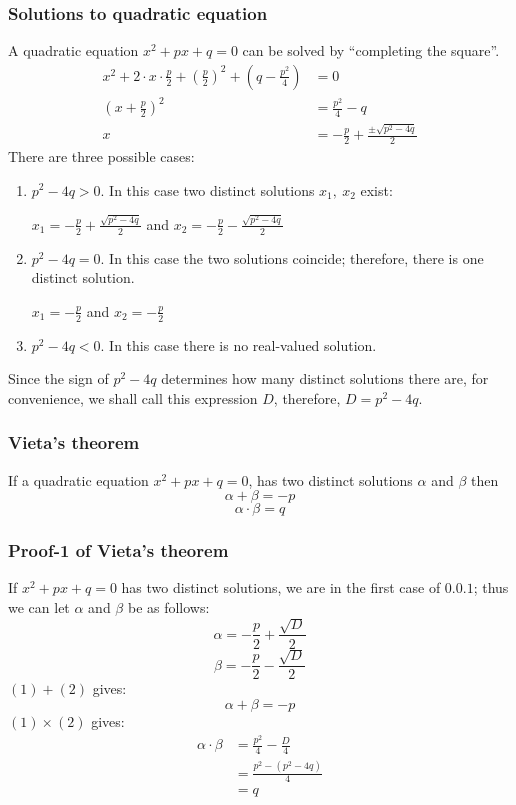\documentclass[12pt]{article}
\begin{document}
\subsubsection{Solutions to quadratic equation}
A quadratic equation $x^2+px+q = 0$ can be solved by ``completing the square''.
\begin{equation*}
	\begin{aligned}
		x^2 + 2 \cdot x \cdot \frac{p}{2} + \left( \frac{p}{2} \right)^2 + \left( q - \frac{p^2}{4} \right) &= 0\\
		\left( x+\frac{p}{2} \right)^2 &= \frac{p^2}{4} - q\\
		x &= -\frac{p}{2} + \frac{ \pm \sqrt{p^2 - 4q} }{2}
	\end{aligned}
\end{equation*}
There are three possible cases:
\begin{enumerate}
	\item $p^2-4q > 0$. In this case two distinct solutions $x_1,\ x_2$ exist: 
	
	$x_1 = -\frac{p}{2} + \frac{ \sqrt{ p^2-4q } }{2}$ and $x_2 = -\frac{p}{2} - \frac{ \sqrt{ p^2-4q } }{2}$
	\item $p^2-4q = 0$. In this case the two solutions coincide; therefore, there is one distinct solution.
	
	$x_1 = -\frac{p}{2}$ and $x_2 = -\frac{p}{2}$
	\item $p^2-4q < 0$. In this case there is no real-valued solution.
\end{enumerate}
Since the sign of $p^2-4q$ determines how many distinct solutions there are, for convenience, we shall call this expression $D$, therefore, $D = p^2-4q$.

\subsubsection{Vieta's theorem}
If a quadratic equation $x^2 + px + q = 0$, has two distinct solutions $\alpha$ and $\beta$ then
\[
	\alpha + \beta = -p
\]
\[
	\alpha \cdot \beta = q
\]

\subsubsection{Proof-1 of Vieta's theorem}
If $x^2 + px + q = 0$ has two distinct solutions, we are in the first case of $0.0.1$; thus we can let $\alpha$ and $\beta$ be as follows:
\setcounter{equation}{0}
\begin{equation}
	\alpha = -\frac{p}{2} + \frac{ \sqrt{ D } }{2}
\end{equation}
\begin{equation}
	\beta = -\frac{p}{2} - \frac{ \sqrt{ D } }{2}
\end{equation}
$(1)+(2)$ gives:
\[
	\alpha + \beta = -p
\]
$(1) \times (2)$ gives:
\begin{equation*}
	\begin{aligned}
		\alpha \cdot \beta &= \frac{p^2}{4} - \frac{D}{4}\\
						   &= \frac{ p^2 - \left( p^2-4q \right) }{4}\\
						   &= q
	\end{aligned}
\end{equation*}
\end{document}
